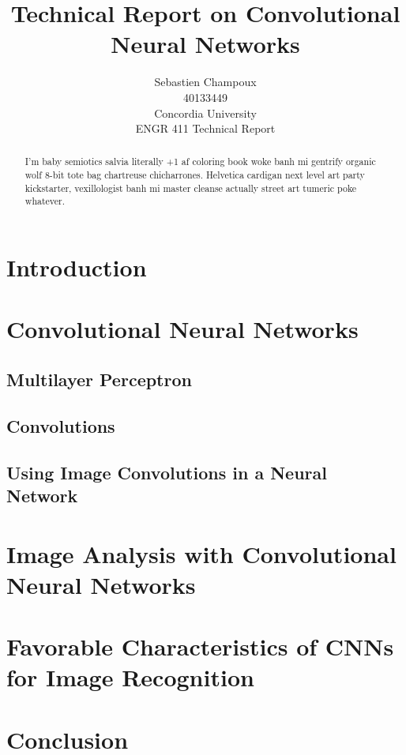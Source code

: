 \documentclass[12pt,a4paper,titlepage]{article}
\begin{document}
\title{Technical Report on Convolutional Neural Networks}
\author{Sebastien Champoux
\\ 40133449
\\ Concordia University
\\ ENGR 411 Technical Report
}
\maketitle

\begin{abstract}
I'm baby semiotics salvia literally +1 af coloring book woke banh mi gentrify organic wolf 8-bit tote bag chartreuse chicharrones. Helvetica cardigan next level art party kickstarter, vexillologist banh mi master cleanse actually street art tumeric poke whatever.
\end{abstract}

\section{Introduction}

\section{Convolutional Neural Networks}

\subsection{Multilayer Perceptron}

\subsection{Convolutions}

\subsection{Using Image Convolutions in a Neural Network}

\section{Image Analysis with Convolutional Neural Networks}

\section{Favorable Characteristics of CNNs for Image Recognition}

\section{Conclusion}

\begin{flushleft}


\end{flushleft}
\end{document}
